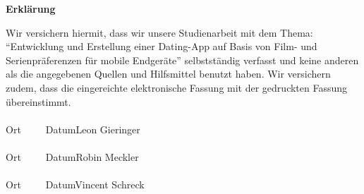 

\newpage
\thispagestyle{empty}
\begin{framed}
	\begin{center}
		\Large\bfseries Erklärung
	\end{center}
	\medskip
	\noindent
	Wir versichern hiermit, dass wir unsere Studienarbeit mit dem Thema:
	\enquote{Entwicklung und Erstellung einer Dating-App auf Basis von Film- und Serienpräferenzen für mobile Endgeräte}
	selbstständig verfasst und keine anderen als die angegebenen Quellen und Hilfsmittel benutzt haben. Wir versichern zudem, dass die eingereichte elektronische Fassung mit der gedruckten Fassung übereinstimmt.
	\vspace{2cm}
	\noindent \\
	\underline{\hspace{4cm}}\hfill\underline{\hspace{6cm}}\\
	Ort~~~~~Datum\hfill Leon Gieringer\hspace{3.3cm}
	\vspace{1cm}
	\noindent \\
	\underline{\hspace{4cm}}\hfill\underline{\hspace{6cm}}\\
	Ort~~~~~Datum\hfill Robin Meckler\hspace{3.35cm}
	\vspace{1cm}
	\noindent \\
	\underline{\hspace{4cm}}\hfill\underline{\hspace{6cm}}\\
	Ort~~~~~Datum\hfill Vincent Schreck\hspace{3.2cm}
\end{framed}

\endinput
